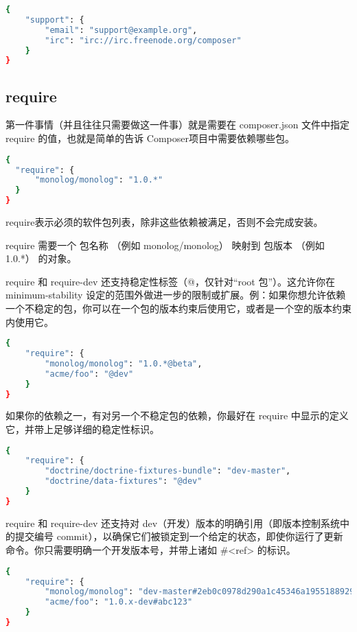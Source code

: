 \begin{lstlisting}[language=bash]
{
    "support": {
        "email": "support@example.org",
        "irc": "irc://irc.freenode.org/composer"
    }
}
\end{lstlisting}



\subsection{require}

第一件事情（并且往往只需要做这一件事）就是需要在 composer.json 文件中指定 require 的值，也就是简单的告诉 Composer项目中需要依赖哪些包。

\begin{lstlisting}[language=bash]
{
  "require": {
      "monolog/monolog": "1.0.*"
  }
}
\end{lstlisting}

require表示必须的软件包列表，除非这些依赖被满足，否则不会完成安装。

require 需要一个 包名称 （例如 monolog/monolog） 映射到 包版本 （例如 1.0.*） 的对象。




require 和 require-dev 还支持稳定性标签（@，仅针对“root 包”）。这允许你在 minimum-stability 设定的范围外做进一步的限制或扩展。例：如果你想允许依赖一个不稳定的包，你可以在一个包的版本约束后使用它，或者是一个空的版本约束内使用它。


\begin{lstlisting}[language=bash]
{
    "require": {
        "monolog/monolog": "1.0.*@beta",
        "acme/foo": "@dev"
    }
}
\end{lstlisting}


如果你的依赖之一，有对另一个不稳定包的依赖，你最好在 require 中显示的定义它，并带上足够详细的稳定性标识。

\begin{lstlisting}[language=bash]
{
    "require": {
        "doctrine/doctrine-fixtures-bundle": "dev-master",
        "doctrine/data-fixtures": "@dev"
    }
}
\end{lstlisting}


require 和 require-dev 还支持对 dev（开发）版本的明确引用（即版本控制系统中的提交编号 commit），以确保它们被锁定到一个给定的状态，即使你运行了更新命令。你只需要明确一个开发版本号，并带上诸如 \#<ref> 的标识。

\begin{lstlisting}[language=bash]
{
    "require": {
        "monolog/monolog": "dev-master#2eb0c0978d290a1c45346a1955188929cb4e5db7",
        "acme/foo": "1.0.x-dev#abc123"
    }
}
\end{lstlisting}

